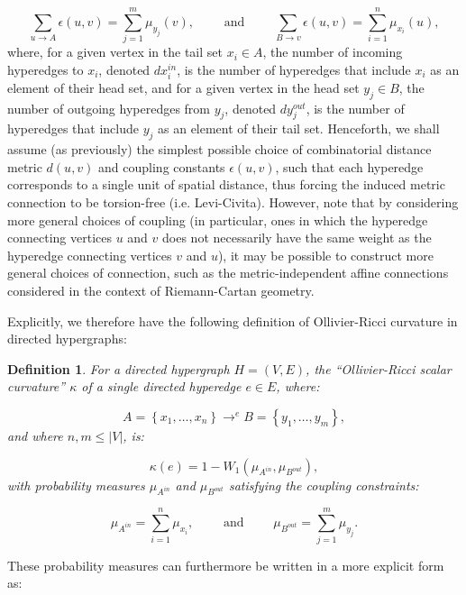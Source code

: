 \documentclass{article}
\newtheorem{definition}{Definition}
\begin{document}
\begin{equation}
\sum_{u \to A} \epsilon \left( u, v \right) = \sum_{j = 1}^{m} \mu_{y_j} \left( v \right), \qquad \text{ and } \qquad \sum_{B \to v} \epsilon \left( u, v \right) = \sum_{i = 1}^{n} \mu_{x_i} \left( u \right),
\end{equation}
where, for a given vertex in the tail set ${x_i \in A}$, the number of incoming hyperedges to ${x_i}$, denoted ${d x_{i}^{in}}$, is the number of hyperedges that include ${x_i}$ as an element of their head set, and for a given vertex in the head set ${y_j \in B}$, the number of outgoing hyperedges from ${y_j}$, denoted ${d y_{j}^{out}}$, is the number of hyperedges that include ${y_j}$ as an element of their tail set. Henceforth, we shall assume (as previously) the simplest possible choice of combinatorial distance metric ${d \left( u, v \right)}$ and coupling constants ${\epsilon \left( u, v \right)}$, such that each hyperedge corresponds to a single unit of spatial distance, thus forcing the induced metric connection to be torsion-free (i.e. Levi-Civita). However, note that by considering more general choices of coupling (in particular, ones in which the hyperedge connecting vertices $u$ and $v$ does not necessarily have the same weight as the hyperedge connecting vertices $v$ and $u$), it may be possible to construct more general choices of connection, such as the metric-independent affine connections considered in the context of Riemann-Cartan geometry.

Explicitly, we therefore have the following definition of Ollivier-Ricci curvature in directed hypergraphs:

\begin{definition}
For a directed hypergraph ${H = \left( V, E \right)}$, the ``Ollivier-Ricci scalar curvature'' ${\kappa}$ of a single directed hyperedge ${e \in E}$, where:

\begin{equation}
A = \left\lbrace x_1, \dots, x_n \right\rbrace \to^{e} B = \left\lbrace y_1, \dots, y_m \right\rbrace,
\end{equation}
and where ${n, m \leq \left\lvert V \right\rvert}$, is:

\begin{equation}
\kappa \left( e \right) = 1 - W_1 \left( \mu_{A^{in}}, \mu_{B^{out}} \right),
\end{equation}
with probability measures ${\mu_{A^{in}}}$ and ${\mu_{B^{out}}}$ satisfying the coupling constraints:

\begin{equation}
\mu_{A^{in}} = \sum_{i = 1}^{n} \mu_{x_i}, \qquad \text{ and } \qquad \mu_{B^{out}} = \sum_{j = 1}^{m} \mu_{y_j}.
\end{equation}
\end{definition}
These probability measures can furthermore be written in a more explicit form as:
\end{document}
